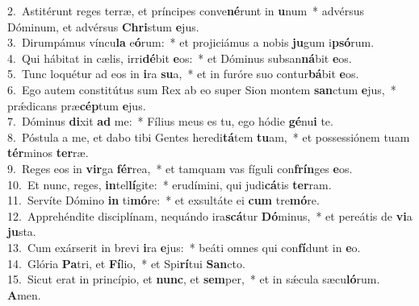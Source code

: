 {2.~}Astitérunt reges terræ, et príncipes conve\textbf{né}runt in \textbf{u}num~* advérsus Dóminum, et advérsus \textbf{Chri}stum \textbf{e}jus.\\
{3.~}Dirumpámus víncu\textbf{la} e\textbf{ó}rum:~* et projiciámus a nobis \textbf{ju}gum i\textbf{psó}rum.\\
{4.~}Qui hábitat in cælis, irri\textbf{dé}bit \textbf{e}os:~* et Dóminus subsan\textbf{ná}bit \textbf{e}os.\\
{5.~}Tunc loquétur ad eos in \textbf{i}ra \textbf{su}a,~* et in furóre suo contur\textbf{bá}bit \textbf{e}os.\\
{6.~}Ego autem constitútus sum Rex ab eo super Sion montem \textbf{san}ctum \textbf{e}jus,~* prǽdicans præ\textbf{cép}tum \textbf{e}jus.\\
{7.~}Dóminus \textbf{di}xit \textbf{ad} me:~* Fílius meus es tu, ego hódie \textbf{gé}nu\textbf{i} te.\\
{8.~}Póstula a me, et dabo tibi Gentes heredi\textbf{tá}tem \textbf{tu}am,~* et possessiónem tuam \textbf{tér}minos \textbf{ter}ræ.\\
{9.~}Reges eos in \textbf{vir}ga \textbf{fér}rea,~* et tamquam vas fíguli con\textbf{frín}ges \textbf{e}os.\\
{10.~}Et nunc, reges, \textbf{in}tel\textbf{lí}gite:~* erudímini, qui judi\textbf{cá}tis \textbf{ter}ram.\\
{11.~}Servíte Dómino \textbf{in} ti\textbf{mó}re:~* et exsultáte ei \textbf{cum} tre\textbf{mó}re.\\
{12.~}Apprehéndite disciplínam, nequándo ira\textbf{scá}tur \textbf{Dó}minus,~* et pereátis de \textbf{vi}a \textbf{ju}sta.\\
{13.~}Cum exárserit in brevi \textbf{i}ra \textbf{e}jus:~* beáti omnes qui con\textbf{fí}dunt in \textbf{e}o.\\
{14.~}Glória \textbf{Pa}tri, et \textbf{Fí}lio,~* et Spi\textbf{rí}tui \textbf{San}cto.\\
{15.~}Sicut erat in princípio, et \textbf{nunc}, et \textbf{sem}per,~* et in sǽcula sæcu\textbf{ló}rum. \textbf{A}men.\\
